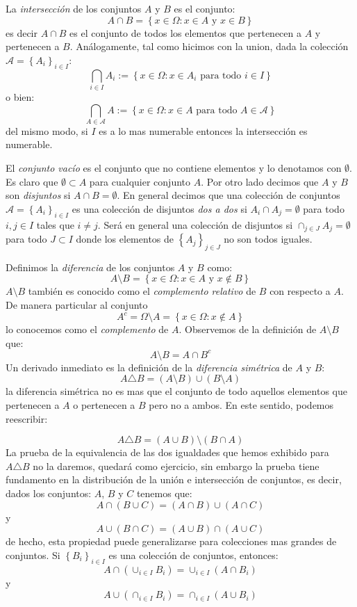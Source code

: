 \documentclass[14pt]{extbook}
\begin{document}
La \emph{intersección} de los conjuntos $A$ y $B$ es el conjunto:
$$
A\cap B = \left\{x\in \Omega: x \in A \text{ y } x \in B\right\}
$$
es decir $A\cap B$ es el conjunto de todos los elementos que pertenecen a $A$ y pertenecen a $B$. Análogamente, tal como hicimos con la union, dada la colección $\mathcal{A} = \left\{A_i\right\}_{i\in I}$:
$$
\bigcap_{i\in I}A_i := \left\{x\in \Omega: x \in A_i \text{ para todo } i\in I \right\}
$$
\noindent
o bien:
\noindent
$$
\bigcap_{A\in \mathcal{A}}A := \left\{x\in \Omega: x \in A \text{ para todo } A\in \mathcal{A} \right\}
$$
del mismo modo, si $I$ es a lo mas numerable entonces la intersección es numerable.

El \emph{conjunto vacío} es el conjunto que no contiene elementos y lo denotamos con $\emptyset$. Es claro que $\emptyset \subset A$ para cualquier conjunto $A$. Por otro lado decimos que $A$ y $B$ son \emph{disjuntos} si $A\cap B = \emptyset$. En general decimos que una colección de conjuntos $\mathcal{A} = \left\{A_i\right\}_{i\in I}$ es una colección de disjuntos \emph{dos a dos} si $A_i\cap A_j = \emptyset$ para todo $i, j\in I$ tales que $i\neq j$. Será en general una colección de disjuntos si $\cap_{j\in J} A_j = \emptyset$ para todo $J \subset I$ donde los elementos de $\left\{A_j\right\}_{j\in J}$ no son todos iguales.

Definimos la \emph{diferencia} de los conjuntos $A$ y $B$ como:
$$
A\setminus B = \left\{x\in \Omega: x  \in A \text{ y } x\notin B\right\}
$$
$A\setminus B$ también es conocido como el \emph{complemento relativo} de $B$ con respecto a $A$. De manera particular al conjunto 
$$
A^c = \Omega\setminus A = \left\{x\in \Omega: x\notin A\right\}
$$
lo conocemos como el \emph{complemento} de $A$.
Observemos de la definición de $A\setminus B$ que:
$$
A\setminus B = A \cap B^c
$$
Un derivado inmediato es la definición de la \emph{diferencia simétrica} de $A$ y $B$:
$$
A\triangle B = (A\setminus B) \cup (B\setminus A)
$$
la diferencia simétrica no es mas que el conjunto de todo aquellos elementos que pertenecen a $A$ o pertenecen a $B$ pero no a ambos. En este sentido, podemos reescribir:

$$
A\triangle B = (A\cup B) \setminus (B\cap A)
$$
La prueba de la equivalencia de las dos igualdades que hemos exhibido para $A\triangle B$ no la daremos, quedará como ejercicio, sin embargo la prueba tiene fundamento en la distribución de la unión e intersección de conjuntos, es decir, dados los conjuntos: $A$, $B$ y $C$ tenemos que:
$$
A \cap (B\cup C) = (A\cap B) \cup (A\cap C)
$$
y 
$$
A \cup (B\cap C) = (A\cup B) \cap (A\cup C)
$$
de hecho, esta propiedad puede generalizarse para colecciones mas grandes de conjuntos. Si $\left\{B_i\right\}_{i\in I}$ es una colección de conjuntos, entonces:
$$
A\cap \left(\cup_{i\in I} B_i\right) = \cup_{i\in I}\left(A\cap B_i\right)
$$
y 
$$
A\cup \left(\cap_{i\in I} B_i\right) = \cap_{i\in I}\left(A\cup B_i\right)
$$
\end{document}
